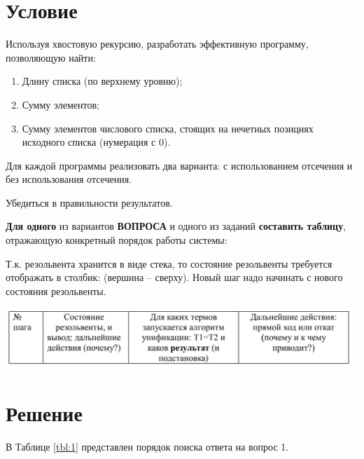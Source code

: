 \section*{Условие}
Используя хвостовую рекурсию, разработать эффективную программу, позволяющую найти:
\begin{enumerate}
	\item Длину списка (по верхнему уровню);
 	\item Сумму элементов;
  \item Сумму элементов числового списка, стоящих на нечетных позициях исходного списка (нумерация с 0).
\end{enumerate}
Для каждой программы реализовать два варианта: с использованием отсечения и без использования отсечения.  

Убедиться в правильности результатов.

\textbf{Для одного} из вариантов \textbf{ВОПРОСА} и одного из заданий \textbf{составить
таблицу}, отражающую конкретный порядок работы системы:

Т.к. резольвента хранится в виде стека, то состояние резольвенты требуется отображать
в столбик: (вершина – сверху). Новый шаг надо начинать с нового состояния резольвенты.  

\includegraphics[scale=0.4]{./inc/img/tb_tmpl}

\section*{Решение}


В Таблице \ref{tbl:1} представлен порядок поиска ответа на вопрос 1.

